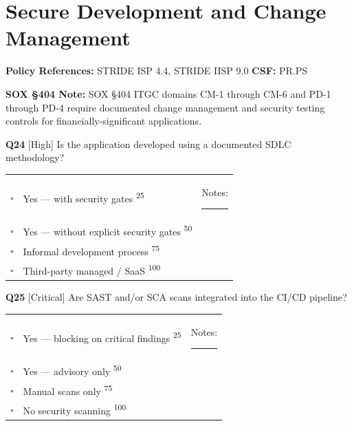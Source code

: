 \documentclass[11pt,landscape]{article}
\newcommand{\soxbox}[1]{\colorbox{soxbox}{\parbox{0.95\textwidth}{\small\textbf{SOX §404 Note:} #1}}}
\begin{document}
\vspace{0.3cm}

\newpage

\section{Secure Development and Change Management}

\textbf{Policy References:} STRIDE ISP 4.4, STRIDE IISP 9.0 \hfill \textbf{CSF:} PR.PS

\soxbox{SOX §404 ITGC domains CM-1 through CM-6 and PD-1 through PD-4 require documented change management and security testing controls for financially-significant applications.}

\vspace{0.2cm}

\noindent\colorbox{highbg}{\textbf{Q24} [High]} Is the application developed using a documented SDLC methodology?

\begin{tabularx}{\textwidth}{cXX}
$\square$ & Yes --- with security gates \textsuperscript{\scriptsize\textcolor{stridegray}{25}} & Notes: \rule{4cm}{0.4pt} \\
$\square$ & Yes --- without explicit security gates \textsuperscript{\scriptsize\textcolor{stridegray}{50}} &  \\
$\square$ & Informal development process \textsuperscript{\scriptsize\textcolor{stridegray}{75}} &  \\
$\square$ & Third-party managed / SaaS \textsuperscript{\scriptsize\textcolor{stridegray}{100}} &  \\
\end{tabularx}

\vspace{0.3cm}

\noindent\colorbox{critbg}{\textbf{Q25} [Critical]} Are SAST and/or SCA scans integrated into the CI/CD pipeline?

\begin{tabularx}{\textwidth}{cXX}
$\square$ & Yes --- blocking on critical findings \textsuperscript{\scriptsize\textcolor{stridegray}{25}} & Notes: \rule{4cm}{0.4pt} \\
$\square$ & Yes --- advisory only \textsuperscript{\scriptsize\textcolor{stridegray}{50}} &  \\
$\square$ & Manual scans only \textsuperscript{\scriptsize\textcolor{stridegray}{75}} &  \\
$\square$ & No security scanning \textsuperscript{\scriptsize\textcolor{stridegray}{100}} &  \\
\end{tabularx}
\end{document}

